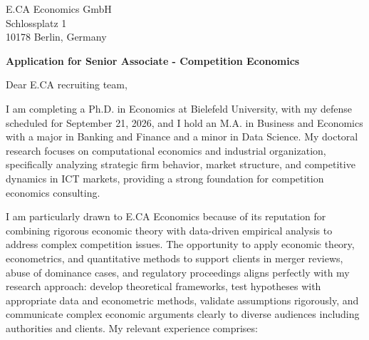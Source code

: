 \documentclass[11pt]{article}
\begin{document}
\vspace{0.1cm}

\vspace{0.1cm}

\noindent
E.CA Economics GmbH \\
Schlossplatz 1 \\
10178 Berlin, Germany

\vspace{0.12cm}

\noindent
\textbf{Application for Senior Associate - Competition Economics}

\vspace{0.1cm}

\noindent Dear E.CA recruiting team,

I am completing a Ph.D. in Economics at Bielefeld University, with my defense scheduled for September 21, 2026, 
and I hold an M.A. in Business and Economics with a major in Banking and Finance and a minor in Data Science. 
My doctoral research focuses on computational economics and industrial organization, 
specifically analyzing strategic firm behavior, market structure, and competitive dynamics in ICT markets, 
providing a strong foundation for competition economics consulting.

I am particularly drawn to E.CA Economics because of its reputation for combining rigorous economic theory with data-driven empirical analysis to address complex competition issues. 
The opportunity to apply economic theory, econometrics, and quantitative methods to support clients in merger reviews, 
abuse of dominance cases, and regulatory proceedings aligns perfectly with my research approach: 
develop theoretical frameworks, test hypotheses with appropriate data and econometric methods, 
validate assumptions rigorously, and communicate complex economic arguments clearly to diverse audiences including authorities and clients.
My relevant experience comprises:
\end{document}
